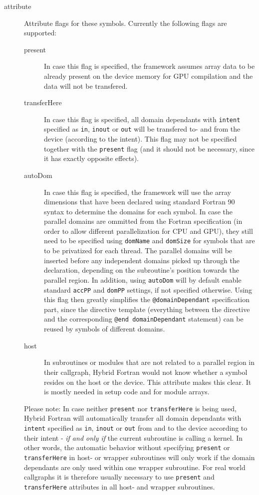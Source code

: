 \begin{description}
 \item [attribute] Attribute flags for these symbols. Currently the following flags are supported:
  \begin{description}
   \item [present] In case this flag is specified, the framework assumes array data to be already present on the device memory for GPU compilation and the data will not be transfered.
   \item [transferHere] In case this flag is specified, all domain dependants with \verb|intent| specified as \verb|in|, \verb|inout| or \verb|out| will be transfered to- and from the device (according to the intent). This flag may not be specified together with the \verb|present| flag (and it should not be necessary, since it has exactly opposite effects).
   \item [autoDom] In case this flag is specified, the framework will use the array dimensions that have been declared using standard Fortran 90 syntax to determine the domains for each symbol. In case the parallel domains are ommitted from the Fortran specification (in order to allow different parallelization for CPU and GPU), they still need to be specified using \verb|domName| and \verb|domSize| for symbols that are to be privatized for each thread. The parallel domains will be inserted before any independent domains picked up through the declaration, depending on the subroutine's position towards the parallel region. In addition, using \verb|autoDom| will by default enable standard \verb|accPP| and \verb|domPP| settings, if not specified otherwise. Using this flag then greatly simplifies the \verb|@domainDependant| specification part, since the directive template (everything between the directive and the corresponding \verb|@end domainDependant| statement) can be reused by symbols of different domains.
   \item [host] In subroutines or modules that are not related to a parallel region in their callgraph, Hybrid Fortran would not know whether a symbol resides on the host or the device. This attribute makes this clear. It is mostly needed in setup code and for module arrays.
  \end{description}
  Please note: In case neither \verb|present| nor \verb|transferHere| is being used, Hybrid Fortran will automatically transfer all domain dependants with \verb|intent| specified as \verb|in|, \verb|inout| or \verb|out| from and to the device according to their intent - \textit{if and only if} the current subroutine is calling a kernel. In other words, the automatic behavior without specifying \verb|present| or \verb|transferHere| in host- or wrapper subroutines will only work if the domain dependants are only used within one wrapper subroutine. For real world callgraphs it is therefore usually necessary to use \verb|present| and \verb|transferHere| attributes in all host- and wrapper subroutines.
\end{description}


